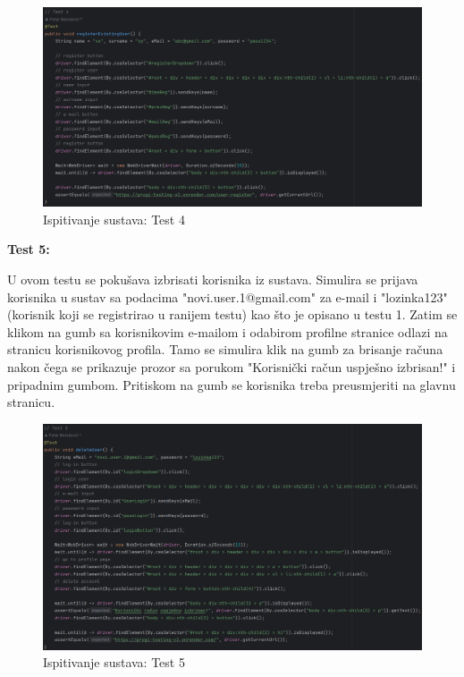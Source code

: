 		 	\begin{figure}[H]
		 		\includegraphics[width=\textwidth]{slike/SeleniumTest4.png} %
		 		\caption{Ispitivanje sustava: Test 4}
		 		\label{fig:SeleniumTest4} %
		 	\end{figure}
		 	
		 	\textbf{Test 5:}
		 	
		 	U ovom testu se pokušava izbrisati korisnika iz sustava. Simulira se prijava korisnika u sustav sa podacima "novi.user.1@gmail.com" za e-mail i "lozinka123" (korisnik koji se registrirao u ranijem testu) kao što je opisano u testu 1. Zatim se klikom na gumb sa korisnikovim e-mailom i odabirom profilne stranice odlazi na stranicu korisnikovog profila. Tamo se simulira klik na gumb za brisanje računa nakon čega se prikazuje prozor sa porukom "Korisnički račun uspješno izbrisan!" i pripadnim gumbom. Pritiskom na gumb se korisnika treba preusmjeriti na glavnu stranicu.
		 	
		 	\begin{figure}[H]
		 		\includegraphics[width=\textwidth]{slike/SeleniumTest5.png} %
		 		\caption{Ispitivanje sustava: Test 5}
		 		\label{fig:SeleniumTest5} %
		 	\end{figure}
		 	
